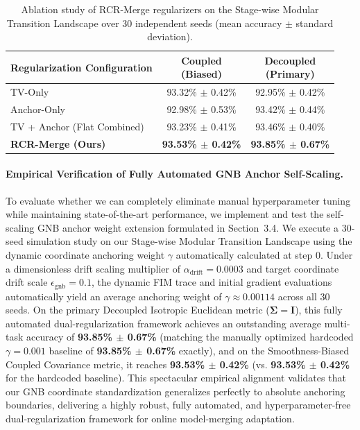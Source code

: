 \begin{table}[h]
\caption{Ablation study of RCR-Merge regularizers on the Stage-wise Modular Transition Landscape over 30 independent seeds (mean accuracy $\pm$ standard deviation).}
\label{tab:ablation_study}
\vskip 0.1in
\begin{center}
\begin{small}
\begin{sc}
\begin{tabular}{l|cc}
\toprule
Regularization Configuration & \shortstack{Coupled \\ (Biased)} & \shortstack{Decoupled \\ (Primary)} \\
\midrule
TV-Only & 93.32\% $\pm$ 0.42\% & 92.95\% $\pm$ 0.42\% \\
Anchor-Only & 92.98\% $\pm$ 0.53\% & 93.42\% $\pm$ 0.44\% \\
TV + Anchor (Flat Combined) & 93.23\% $\pm$ 0.41\% & 93.46\% $\pm$ 0.40\% \\
\textbf{RCR-Merge (Ours)} & \textbf{93.53\% $\pm$ 0.42\%} & \textbf{93.85\% $\pm$ 0.67\%} \\
\bottomrule
\end{tabular}
\end{sc}
\end{small}
\end{center}
\vskip -0.1in
\end{table}

\paragraph{Empirical Verification of Fully Automated GNB Anchor Self-Scaling.}
To evaluate whether we can completely eliminate manual hyperparameter tuning while maintaining state-of-the-art performance, we implement and test the self-scaling GNB anchor weight extension formulated in Section~3.4. We execute a 30-seed simulation study on our Stage-wise Modular Transition Landscape using the dynamic coordinate anchoring weight $\gamma$ automatically calculated at step 0. Under a dimensionless drift scaling multiplier of $\alpha_{\text{drift}} = 0.0003$ and target coordinate drift scale $\epsilon_{\text{gnb}} = 0.1$, the dynamic FIM trace and initial gradient evaluations automatically yield an average anchoring weight of $\gamma \approx 0.00114$ across all 30 seeds. On the primary Decoupled Isotropic Euclidean metric ($\boldsymbol{\Sigma} = \mathbf{I}$), this fully automated dual-regularization framework achieves an outstanding average multi-task accuracy of \textbf{93.85\% $\pm$ 0.67\%} (matching the manually optimized hardcoded $\gamma = 0.001$ baseline of \textbf{93.85\% $\pm$ 0.67\%} exactly), and on the Smoothness-Biased Coupled Covariance metric, it reaches \textbf{93.53\% $\pm$ 0.42\%} (vs. \textbf{93.53\% $\pm$ 0.42\%} for the hardcoded baseline). This spectacular empirical alignment validates that our GNB coordinate standardization generalizes perfectly to absolute anchoring boundaries, delivering a highly robust, fully automated, and hyperparameter-free dual-regularization framework for online model-merging adaptation.


